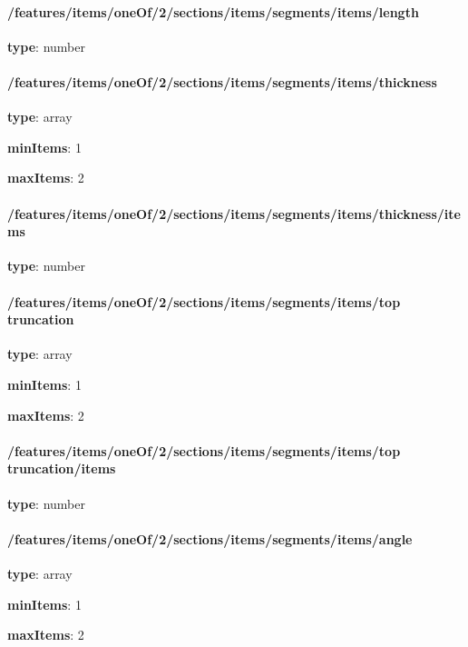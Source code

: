 \paragraph{/features/items/oneOf/2/sections/items/segments/items/length} \begin{itemized}
\item {\bf type}: number
\end{itemized}\paragraph{/features/items/oneOf/2/sections/items/segments/items/thickness} \begin{itemized}
\item {\bf type}: array
\item {\bf minItems}: 1
\item {\bf maxItems}: 2
\paragraph{/features/items/oneOf/2/sections/items/segments/items/thickness/items} \begin{itemized}
\item {\bf type}: number
\end{itemized}\end{itemized}\paragraph{/features/items/oneOf/2/sections/items/segments/items/top truncation} \begin{itemized}
\item {\bf type}: array
\item {\bf minItems}: 1
\item {\bf maxItems}: 2
\paragraph{/features/items/oneOf/2/sections/items/segments/items/top truncation/items} \begin{itemized}
\item {\bf type}: number
\end{itemized}\end{itemized}\paragraph{/features/items/oneOf/2/sections/items/segments/items/angle} \begin{itemized}
\item {\bf type}: array
\item {\bf minItems}: 1
\item {\bf maxItems}: 2

\end{itemized}
